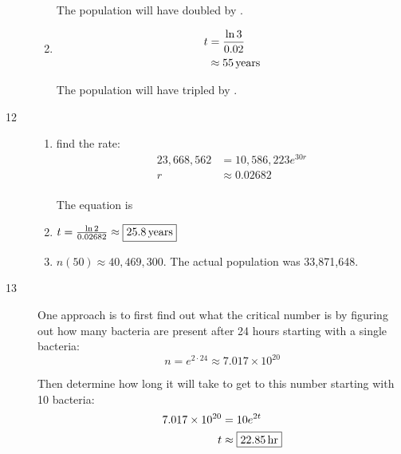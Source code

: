 \documentclass{exam}
\begin{document}
\begin{description}
\begin{enumerate}[a]
            The population will have doubled by .

          \item 
            \begin{align*}
              t & = \frac{\ln 3}{0.02} \\
                & \approx \unit[55]{years} \\
            \end{align*}

            The population will have tripled by .
        \end{enumerate}

      \item[12] 
        \begin{enumerate}[a]
          \item 
            find the rate:
            \begin{align*}
              23,668,562 & = 10,586,223 e^{30r} \\
              r          & \approx 0.02682 \\
            \end{align*}

            The equation is 

          \item $t = \frac{\ln 2}{0.02682} \approx \boxed{ \unit[25.8]{years} }$

          \item $n(50) \approx \boxed{40,469,300}$.  The actual population was 33,871,648.
        \end{enumerate}

      \pagebreak

      \item[13] 
        One approach is to first find out what the critical number is by figuring out how many bacteria are present
        after 24 hours starting with a single bacteria:
        \[
          n = e^{2 \cdot 24} \approx 7.017 \times 10^{20}
        \]
        
        Then determine how long it will take to get to this number starting with 10 bacteria:
        \begin{align*}
          7.017 \times 10^{20} & = 10 e^{2t} \\
          t                    & \approx \boxed{\unit[22.85]{hr}} \\
        \end{align*}


\end{description}
\end{document}
